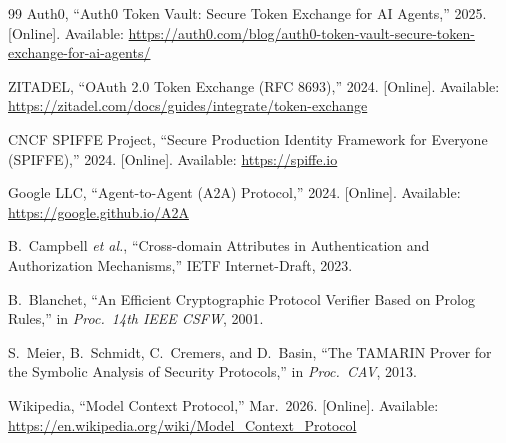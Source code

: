 \documentclass[journal]{IEEEtran}
\begin{document}
\begin{thebibliography}{99}
Auth0,
``Auth0 Token Vault: Secure Token Exchange for AI Agents,'' 2025.
[Online]. Available:
\url{https://auth0.com/blog/auth0-token-vault-secure-token-exchange-for-ai-agents/}

ZITADEL,
``OAuth 2.0 Token Exchange (RFC 8693),'' 2024.
[Online]. Available:
\url{https://zitadel.com/docs/guides/integrate/token-exchange}

CNCF SPIFFE Project,
``Secure Production Identity Framework for Everyone (SPIFFE),'' 2024.
[Online]. Available: \url{https://spiffe.io}

Google LLC, ``Agent-to-Agent (A2A) Protocol,'' 2024.
[Online]. Available: \url{https://google.github.io/A2A}

B.\ Campbell \textit{et al.},
``Cross-domain Attributes in Authentication and Authorization Mechanisms,''
IETF Internet-Draft, 2023.

B.\ Blanchet,
``An Efficient Cryptographic Protocol Verifier Based on Prolog Rules,''
in \textit{Proc.\ 14th IEEE CSFW}, 2001.

S.\ Meier, B.\ Schmidt, C.\ Cremers, and D.\ Basin,
``The TAMARIN Prover for the Symbolic Analysis of Security Protocols,''
in \textit{Proc.\ CAV}, 2013.

Wikipedia,
``Model Context Protocol,'' Mar.\ 2026.
[Online]. Available:
\url{https://en.wikipedia.org/wiki/Model_Context_Protocol}

\end{thebibliography}
\end{document}
